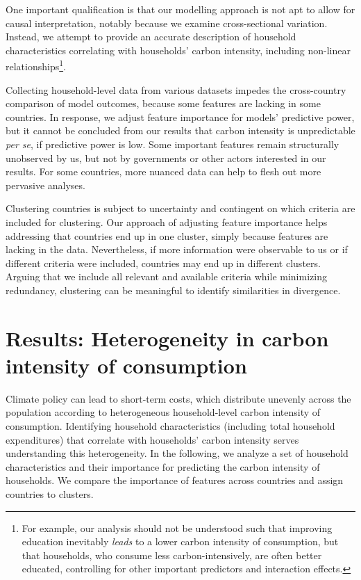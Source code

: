 \documentclass[12pt, a4paper]{article}
\begin{document}
One important qualification is that our modelling approach is not apt to allow for causal interpretation, notably because we examine cross-sectional variation. Instead, we attempt to provide an accurate description of household characteristics correlating with households' carbon intensity, including non-linear relationships\footnote{For example, our analysis should not be understood such that improving education inevitably \textit{leads} to a lower carbon intensity of consumption, but that households, who consume less carbon-intensively, are often better educated, controlling for other important predictors and interaction effects.}.

Collecting household-level data from various datasets impedes the cross-country comparison of model outcomes, because some features are lacking in some countries. In response, we adjust feature importance for models' predictive power, but it cannot be concluded from our results that carbon intensity is unpredictable \textit{per se}, if predictive power is low. Some important features remain structurally unobserved by us, but not by governments or other actors interested in our results. For some countries, more nuanced data can help to flesh out more pervasive analyses.

Clustering countries is subject to uncertainty and contingent on which criteria are included for clustering. Our approach of adjusting feature importance helps addressing that countries end up in one cluster, simply because features are lacking in the data. Nevertheless, if more information were observable to us or if different criteria were included, countries may end up in different clusters. Arguing that we include all relevant and available criteria while minimizing redundancy, clustering can be meaningful to identify similarities in divergence.

\section{Results: Heterogeneity in carbon intensity of consumption} \label{sec:results}

Climate policy can lead to short-term costs, which distribute unevenly across the population according to heterogeneous household-level carbon intensity of consumption. Identifying household characteristics (including total household expenditures) that correlate with households' carbon intensity serves understanding this heterogeneity. In the following, we analyze a set of household characteristics and their importance for predicting the carbon intensity of households. We compare the importance of features across countries and assign countries to clusters.
\end{document}
